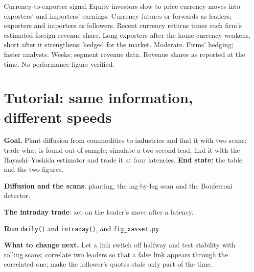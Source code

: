 \begin{strategyfile}{Currency-to-exporter signal}\label{strat:s1:cross-asset-lead-lag:currency}
 Equity investors slow to price currency moves into exporters' and importers' earnings.
 Currency futures or forwards as leaders; exporters and importers as followers.
 Recent currency returns times each firm's estimated foreign revenue share.
 Long exporters after the home currency weakens, short after it strengthens; hedged for the market.
 Moderate.
 Firms' hedging; faster analysts.
 Weeks; segment revenue data.
 Revenue shares as reported at the time.
 No performance figure verified.
\end{strategyfile}

\section{Tutorial: same information, different speeds}\label{tut:s1:cross-asset-lead-lag:tut}

\begin{tutorial}
\textbf{Goal.} Plant diffusion from commodities to industries and find it with two scans; trade what is found out of sample; simulate a two-second lead,
find it with the Hayashi--Yoshida estimator and trade it at four latencies. \textbf{End state:} the table and the two figures.
\begin{tutsteps}
\item \textbf{Diffusion and the scans}: planting, the lag-by-lag scan and the Bonferroni detector.
\label{lst:s1:cross-asset-lead-lag:scan}
\item \textbf{The intraday trade}: act on the leader's move after a latency.
\label{lst:s1:cross-asset-lead-lag:trades}
\item \textbf{Run} \texttt{daily()} and \texttt{intraday()}, and \texttt{fig\_xasset.py}.
\end{tutsteps}
\textbf{What to change next.} Let a link switch off halfway and test stability with rolling scans; correlate two leaders so that a false link appears
through the correlated one; make the follower's quotes stale only part of the time.
\end{tutorial}

